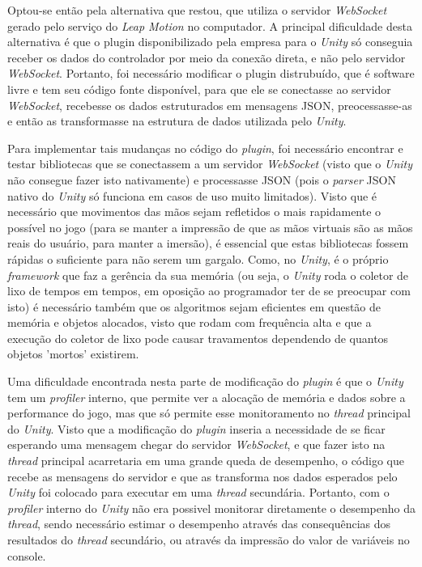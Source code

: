 Optou-se então pela alternativa que restou, que utiliza o servidor
\textit{WebSocket} gerado pelo serviço do \textit{Leap Motion} no computador. 
A principal dificuldade desta alternativa é que o plugin disponibilizado 
pela empresa para o \textit{Unity} só conseguia receber os dados do controlador 
por meio da conexão direta, e não pelo servidor \textit{WebSocket}. Portanto, foi 
necessário modificar o plugin distrubuído, que é software livre e tem seu 
código fonte disponível, para que ele se conectasse ao servidor \textit{WebSocket}, 
recebesse os dados estruturados em mensagens JSON, preocessasse-as e 
então as transformasse na estrutura de dados utilizada pelo \textit{Unity}.

Para implementar tais mudanças no código do \textit{plugin}, foi necessário encontrar 
e testar bibliotecas que se conectassem a um servidor
\textit{WebSocket} (visto que o \textit{Unity} não consegue fazer 
isto nativamente) e processasse JSON (pois o \textit{parser} JSON nativo 
do \textit{Unity} só funciona em casos de uso muito limitados). Visto que 
é necessário que movimentos das mãos sejam refletidos o mais rapidamente 
o possível no jogo (para se manter a impressão de que as mãos virtuais 
são as mãos reais do usuário, para manter a imersão), é essencial que 
estas bibliotecas fossem rápidas o suficiente para não serem um gargalo. 
Como, no \textit{Unity}, é o próprio \textit{framework}
que faz a gerência da sua memória (ou seja, o \textit{Unity} roda o coletor de 
lixo de tempos em tempos, em oposição ao programador ter de se preocupar com isto)
é necessário também que os algoritmos sejam eficientes em questão de memória 
e objetos alocados, visto que rodam com frequência alta e que a execução do
coletor de lixo pode causar travamentos dependendo de quantos objetos 'mortos' 
existirem.

Uma dificuldade encontrada nesta parte de modificação do \textit{plugin} é que o
\textit{Unity} tem um \textit{profiler} interno, que permite ver a alocação
de memória e dados sobre a performance do jogo, mas que só permite esse
monitoramento no \textit{thread} principal do \textit{Unity}. Visto que a 
modificação do \textit{plugin} inseria a necessidade de se ficar esperando uma 
mensagem chegar do servidor \textit{WebSocket}, e que fazer isto na 
\textit{thread} principal acarretaria em uma grande queda de desempenho, 
o código que recebe as mensagens do servidor e que as transforma nos dados
esperados pelo \textit{Unity} foi colocado para executar em uma \textit{thread}
secundária. Portanto, com o \textit{profiler} interno do \textit{Unity} não
era possivel monitorar diretamente o desempenho da \textit{thread}, sendo 
necessário estimar o desempenho através das consequências dos resultados do 
\textit{thread} secundário, ou através da impressão do valor de variáveis
no console.

               

